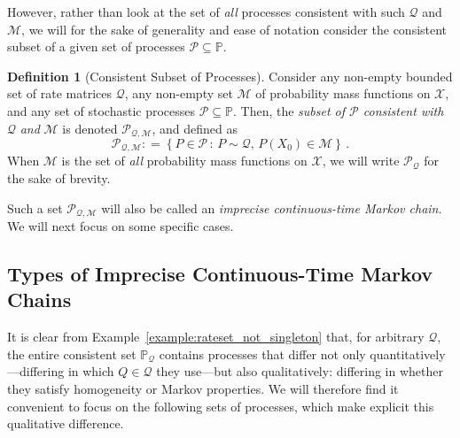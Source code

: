 \documentclass[10pt,a4paper]{paper}
\theoremstyle{definition}
\newtheorem{definition}{Definition}
\newcommand{\states}{\mathcal{X}}
\newcommand{\processes}{\mathbb{P}}
\newcommand{\rateset}{\mathcal{Q}}
\newcommand{\coloneqq}{:\!=}
\begin{document}
However, rather than look at the set of \emph{all} processes consistent with such $\rateset$ and $\mathcal{M}$, we will for the sake of generality and ease of notation consider the consistent subset of a given set of processes $\mathcal{P}\subseteq\processes$.


\begin{definition}[Consistent Subset of Processes]\label{def:consistent_process_set}
Consider any non-empty bounded set of rate matrices $\rateset$, any non-empty set $\mathcal{M}$ of probability mass functions on $\states$, and any set of stochastic processes $\mathcal{P}\subseteq\processes$. Then, the \emph{subset of $\mathcal{P}$ consistent with} $\rateset$ \emph{and} $\mathcal{M}$ is denoted $\mathcal{P}_{\rateset,\mathcal{M}}$, and defined as
\begin{equation*}
\mathcal{P}_{\rateset,\mathcal{M}} \coloneqq \left\{P\in\mathcal{P}\,:\,P\sim\rateset,\,P(X_0)\in\mathcal{M}\right\}\,.
\end{equation*}
When $\mathcal{M}$ is the set of \emph{all} probability mass functions on $\states$, we will write $\mathcal{P}_{\rateset}$ for the sake of brevity.
\end{definition}
Such a set $\mathcal{P}_{\rateset,\mathcal{M}}$ will also be called an \emph{imprecise continuous-time Markov chain}. We will next focus on some specific cases.

\subsection{Types of Imprecise Continuous-Time Markov Chains}\label{subsec:types_ictmc}

It is clear from Example~\ref{example:rateset_not_singleton} that, for arbitrary $\rateset$, the entire consistent set $\processes_\rateset$ contains processes that differ not only quantitatively---differing in which $Q\in\rateset$ they use---but also qualitatively: differing in whether they satisfy homogeneity or Markov properties. We will therefore find it convenient to focus on the following sets of processes, which make explicit this qualitative difference.
\end{document}

